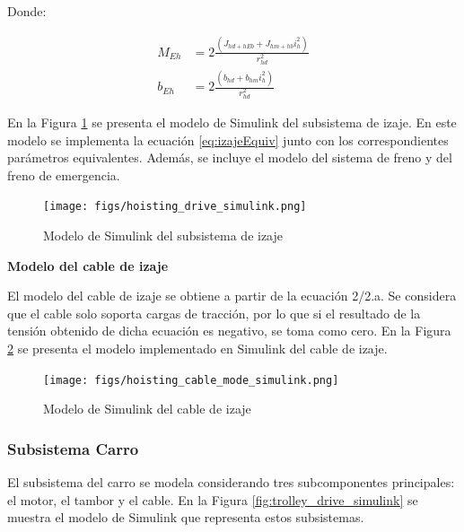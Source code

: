 \documentclass{article}
\begin{document}
            Donde:

            \begin{align} \label{eq:izajeParamsEquiv}
                M_{Eh} &= 2\frac{(J_{hd+hEb} + J_{hm+hb} i_h^2)}{r_{hd}^2} \\
                b_{Eh} &= 2\frac{(b_{hd} + b_{hm} i_h^2)}{r_{hd}^2}
            \end{align}

            En la Figura \ref{fig:hoisting_drive_simulink} se presenta el modelo de Simulink del subsistema de izaje. En este modelo se implementa la ecuación \ref{eq:izajeEquiv} junto con los correspondientes parámetros equivalentes. Además, se incluye el modelo del sistema de freno y del freno de emergencia.

            \begin{figure} [H]
                \centering
                \texttt{[image: figs/hoisting\_drive\_simulink.png]}
                \caption{Modelo de Simulink del subsistema de izaje}
                \label{fig:hoisting_drive_simulink}
            \end{figure}

            \textbf{Modelo del cable de izaje}

            El modelo del cable de izaje se obtiene a partir de la ecuación 2/2.a. Se considera que el cable solo soporta cargas de tracción, por lo que si el resultado de la tensión obtenido de dicha ecuación es negativo, se toma como cero. En la Figura \ref{fig:hoisting_cable_mode_simulink} se presenta el modelo implementado en Simulink del cable de izaje.

            \begin{figure} [H]
                \centering
                \texttt{[image: figs/hoisting\_cable\_mode\_simulink.png]}
                \caption{Modelo de Simulink del cable de izaje}
                \label{fig:hoisting_cable_mode_simulink}
            \end{figure}



            \subsubsection{Subsistema Carro}

            El subsistema del carro se modela considerando tres subcomponentes principales: el motor, el tambor y el cable. En la Figura \ref{fig:trolley_drive_simulink} se muestra el modelo de Simulink que representa estos subsistemas.
            
\end{document}
